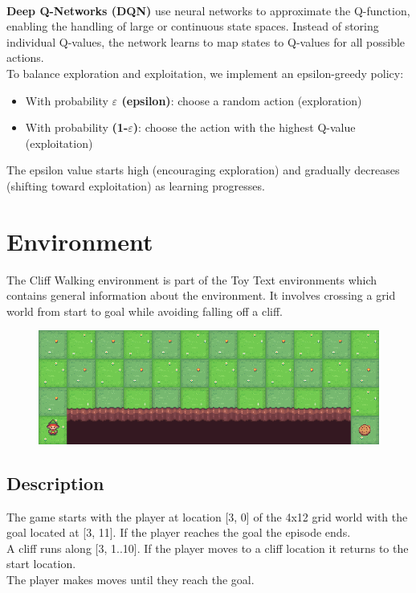 \documentclass[a4paper,12pt]{article}
\begin{document}
\vspace{0,5cm}\\
\textbf{Deep Q-Networks (DQN)} use neural networks to approximate the Q-function, enabling the handling of large or continuous state spaces. Instead of storing individual Q-values, the network learns to map states to Q-values for all possible actions.
\vspace{0,5cm}\\
To balance exploration and exploitation, we implement an epsilon-greedy policy:
\begin{itemize}
    \item With probability \textbf{$\varepsilon$ (epsilon)}: choose a random action (exploration)
    \item With probability \textbf{(1-$\varepsilon$)}: choose the action with the highest Q-value (exploitation)
\end{itemize}
The epsilon value starts high (encouraging exploration) and gradually decreases (shifting toward exploitation) as learning progresses.
\section{Environment}
The Cliff Walking environment is part of the Toy Text environments which contains general information about the environment. It involves crossing a grid world from start to goal while avoiding falling off a cliff.
\begin{figure}[H]
    \centering
    \includegraphics[scale=0.7]{cliff_walking.png}
\end{figure}
\subsection{Description}
The game starts with the player at location [3, 0] of the 4x12 grid world with the goal located at [3, 11]. If the player reaches the goal the episode ends.
\vspace{0,5cm}\\
A cliff runs along [3, 1..10]. If the player moves to a cliff location it returns to the start location.
\vspace{0,5cm}\\
The player makes moves until they reach the goal.
\end{document}
